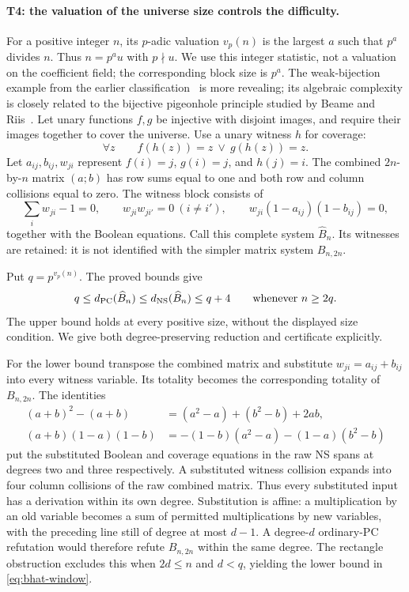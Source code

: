 \documentclass[11pt,a4paper]{article}
\theoremstyle{definition}\newtheorem{definition}[theorem]{Definition}
\theoremstyle{remark}\newtheorem{remark}[theorem]{Remark}
\begin{document}
\paragraph{T4: the valuation of the universe size controls the difficulty.}
For a positive integer $n$, its $p$-adic valuation $v_p(n)$ is the
largest $a$ such that $p^a$ divides $n$. Thus $n=p^a u$ with
$p\nmid u$. We use this integer statistic, not a valuation on the
coefficient field; the corresponding block size is $p^a$.
The weak-bijection example from the earlier classification~\cite[Section~5]{Riis}
is more revealing; its algebraic complexity is closely related to the
bijective pigeonhole principle studied by Beame and Riis~\cite{BeameRiis}.
Let unary functions $f,g$
be injective with disjoint images, and require their images together to
cover the universe. Use a unary witness $h$ for coverage:
\[
 \forall z\qquad f(h(z))=z\ \vee\ g(h(z))=z.
\]
Let $a_{ij},b_{ij},w_{ji}$ represent $f(i)=j$, $g(i)=j$, and $h(j)=i$.
The combined $2n$-by-$n$ matrix $(a;b)$ has row sums equal to one and both
row and column collisions equal to zero. The witness block consists of
\begin{equation}\label{eq:bhat-witness}
 \sum_iw_{ji}-1=0,\qquad
 w_{ji}w_{ji'}=0\ (i\ne i'),\qquad
 w_{ji}(1-a_{ij})(1-b_{ij})=0,
\end{equation}
together with the Boolean equations. Call this complete system
$\widehat B_n$. Its witnesses are retained: it is not identified with the
simpler matrix system $B_{n,2n}$.

Put $q=p^{v_p(n)}$. The proved bounds give
\begin{equation}\label{eq:bhat-window}
 q\leq d_{\mathrm{PC}}(\widehat B_n)
 \leq d_{\mathrm{NS}}(\widehat B_n)\leq q+4
 \qquad\hbox{whenever } n\geq2q.
\end{equation}
The upper bound holds at every positive size, without the displayed size
condition. We give both degree-preserving reduction and certificate
explicitly.

For the lower bound transpose the combined matrix and substitute
$w_{ji}=a_{ij}+b_{ij}$ into every witness variable. Its totality becomes
the corresponding totality of $B_{n,2n}$. The identities
\begin{align*}
(a+b)^2-(a+b)&=(a^2-a)+(b^2-b)+2ab,\\
(a+b)(1-a)(1-b)&=-(1-b)(a^2-a)-(1-a)(b^2-b)
\end{align*}
put the substituted Boolean and coverage equations in the raw NS spans
at degrees two and three respectively. A substituted witness collision
expands into four column collisions of the raw combined matrix.
Thus every substituted input has a derivation within its own degree.
Substitution is affine: a multiplication by an old variable becomes a
sum of permitted multiplications by new variables, with the preceding
line still of degree at most $d-1$. A degree-$d$ ordinary-PC refutation
would therefore refute $B_{n,2n}$ within the same degree. The rectangle
obstruction excludes this when $2d\le n$ and $d<q$, yielding the lower
bound in \eqref{eq:bhat-window}.
\end{document}
